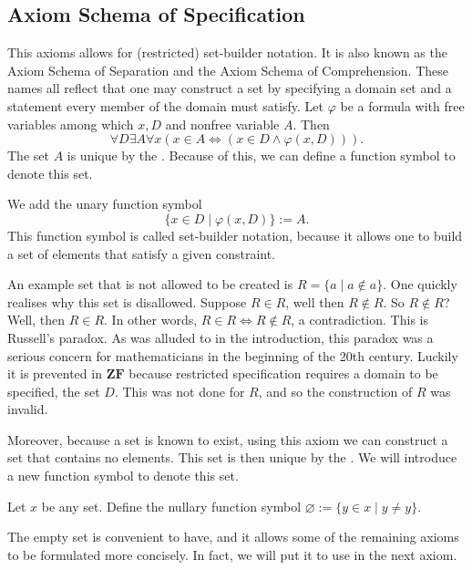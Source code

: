 \documentclass[../main.tex]{subfiles}
\begin{document}
\subsection*{Axiom Schema of Specification}\label{subsec:zermelo_fraenkel_set_theory:axiom_schema_of_specification}
This axioms allows for (restricted) set-builder notation. It is also known as the Axiom Schema of Separation and the Axiom Schema of Comprehension. These names all reflect that one may construct a set by specifying a domain set and a statement every member of the domain must satisfy. Let $\varphi$ be a formula with free variables among which $x,D$ and nonfree variable $A$. Then
\begin{equation*}
    \forall D\exists A\forall x(x\in A\iff(x\in D\land\varphi(x,D))).
\end{equation*}
The set $A$ is unique by the . Because of this, we can define a function symbol to denote this set.
\begin{definition}
    We add the unary function symbol
    \begin{equation*}
        \{x\in D\mid\varphi(x,D)\}:=A.
    \end{equation*}
    This function symbol is called set-builder notation, because it allows one to build a set of elements that satisfy a given constraint.
\end{definition}
An example set that is not allowed to be created is $R=\{a\mid a\notin a\}$. One quickly realises why this set is disallowed. Suppose $R\in R$, well then $R\notin R$. So $R\notin R$? Well, then $R\in R$. In other words, $R\in R\iff R\notin R$, a contradiction. This is Russell's paradox. As was alluded to in the introduction, this paradox was a serious concern for mathematicians in the beginning of the 20th century. Luckily it is prevented in $\mathbf{ZF}$ because restricted specification requires a domain to be specified, the set $D$. This was not done for $R$, and so the construction of $R$ was invalid.

Moreover, because a set is known to exist, using this axiom we can construct a set that contains no elements. This set is then unique by the . We will introduce a new function symbol to denote this set.
\begin{definition}
    Let $x$ be any set. Define the nullary function symbol $\varnothing:=\{y\in x\mid y\neq y\}$.
\end{definition}
The empty set is convenient to have, and it allows some of the remaining axioms to be formulated more concisely. In fact, we will put it to use in the next axiom.
\end{document}
